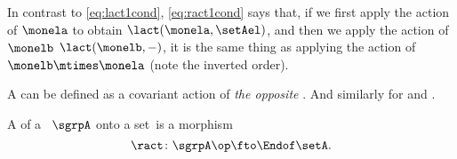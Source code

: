 In contrast to \cref{eq:lact1cond}, \cref{eq:ract1cond} says that, if we first apply the action of $\monela$ to obtain $\lact(\monela, \setAel)$,
and then we apply the action of $\monelb$ $\lact(\monelb, -)$, it is the same thing as applying the action of $\monelb\mtimes\monela$ (note the inverted order).

A  can be defined as a covariant action of \emph{the opposite} .
And similarly for  and .

\begin{ctdefinition}
    \label{def:semigroup-cont-action}
    A  of a ~$\sgrpA$ onto a set~\setA is a  morphism
    \begin{equation}
        \ract \colon \sgrpA\op \fto \Endof\setA.
    \end{equation}
\end{ctdefinition}


